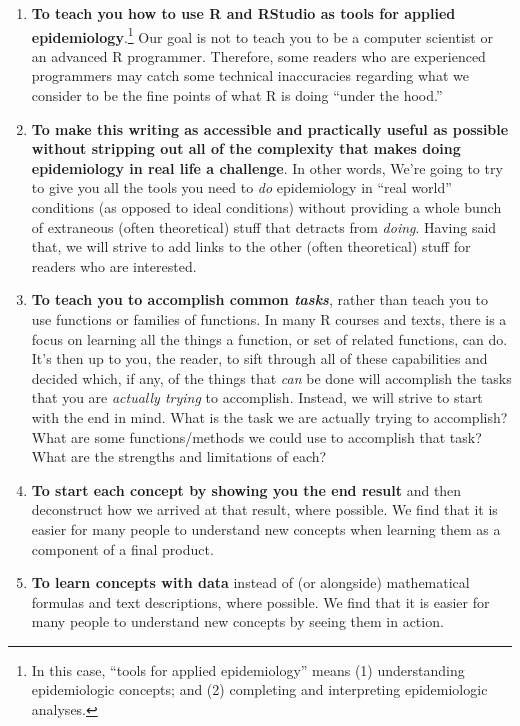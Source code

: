 \documentclass[
  letterpaper,
  DIV=11,
  numbers=noendperiod]{scrreprt}
\begin{document}
\begin{enumerate}
\def\labelenumi{\arabic{enumi}.}
\item
  \textbf{To teach you how to use R and RStudio as tools for applied
  epidemiology}.\footnote{In this case, ``tools for applied
    epidemiology'' means (1) understanding epidemiologic concepts; and
    (2) completing and interpreting epidemiologic analyses.} Our goal is
  not to teach you to be a computer scientist or an advanced R
  programmer. Therefore, some readers who are experienced programmers
  may catch some technical inaccuracies regarding what we consider to be
  the fine points of what R is doing ``under the hood.''
\item
  \textbf{To make this writing as accessible and practically useful as
  possible without stripping out all of the complexity that makes doing
  epidemiology in real life a challenge}. In other words, We're going to
  try to give you all the tools you need to \emph{do} epidemiology in
  ``real world'' conditions (as opposed to ideal conditions) without
  providing a whole bunch of extraneous (often theoretical) stuff that
  detracts from \emph{doing}. Having said that, we will strive to add
  links to the other (often theoretical) stuff for readers who are
  interested.
\item
  \textbf{To teach you to accomplish common \emph{tasks}}, rather than
  teach you to use functions or families of functions. In many R courses
  and texts, there is a focus on learning all the things a function, or
  set of related functions, can do. It's then up to you, the reader, to
  sift through all of these capabilities and decided which, if any, of
  the things that \emph{can} be done will accomplish the tasks that you
  are \emph{actually trying} to accomplish. Instead, we will strive to
  start with the end in mind. What is the task we are actually trying to
  accomplish? What are some functions/methods we could use to accomplish
  that task? What are the strengths and limitations of each?
\item
  \textbf{To start each concept by showing you the end result} and then
  deconstruct how we arrived at that result, where possible. We find
  that it is easier for many people to understand new concepts when
  learning them as a component of a final product.
\item
  \textbf{To learn concepts with data} instead of (or alongside)
  mathematical formulas and text descriptions, where possible. We find
  that it is easier for many people to understand new concepts by seeing
  them in action.
\end{enumerate}
\end{document}
